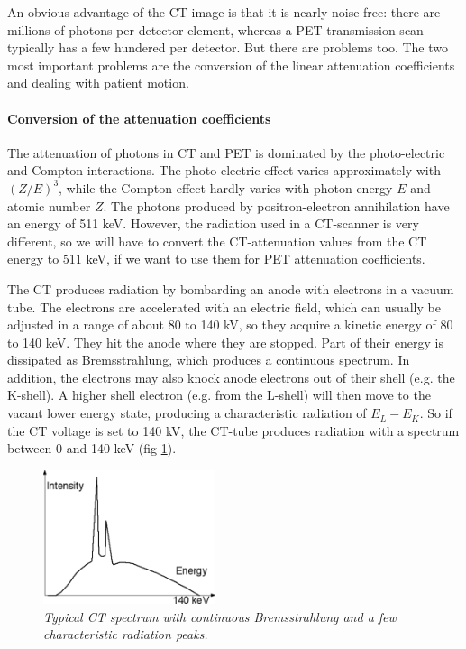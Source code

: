 \documentclass[11pt,oneside]{article}
\begin{document}
An obvious advantage of the CT image is that it is nearly noise-free:
there are millions of photons per detector element, whereas a
PET-transmission scan typically has a few hundered per detector. But
there are problems too. The two most important problems are the
conversion of the linear attenuation coefficients and dealing with
patient motion.

\paragraph{Conversion of the attenuation coefficients}
The attenuation of photons in CT and PET is dominated by the photo-electric and
Compton interactions. The photo-electric effect varies approximately with
$(Z/E)^3$, while the Compton effect hardly varies with photon energy $E$ and
atomic number $Z$. The photons produced by positron-electron annihilation have
an energy of 511 keV. However, the radiation used in a CT-scanner is very
different, so we will have to convert the CT-attenuation values from the CT
energy to 511 keV, if we want to use them for PET attenuation coefficients.

The CT produces radiation by bombarding an anode with electrons in a vacuum
tube. The electrons are accelerated with an electric field, which can usually
be adjusted in a range of about 80 to 140 kV, so they acquire a kinetic energy
of 80 to 140 keV. They hit the anode where they are stopped. Part of their
energy is dissipated as Bremsstrahlung, which produces a continuous spectrum.
In addition, the electrons may also knock anode electrons out of their shell
(e.g. the K-shell). A higher shell electron (e.g. from the L-shell) will then
move to the vacant lower energy state, producing a characteristic radiation of
$E_L - E_K$. So if the CT voltage is set to 140 kV, the CT-tube produces
radiation with a spectrum between 0 and 140 keV (fig \ref{fig:ctspectrum}).
%
\begin{figure}[tbp]
\centering
\includegraphics[width=0.45\textwidth]{figs/fig_ctspectrum.pdf}
\caption{\label{fig:ctspectrum} \emph{Typical CT spectrum with continuous
Bremsstrahlung and a few characteristic radiation peaks.}}
\end{figure}
\end{document}
